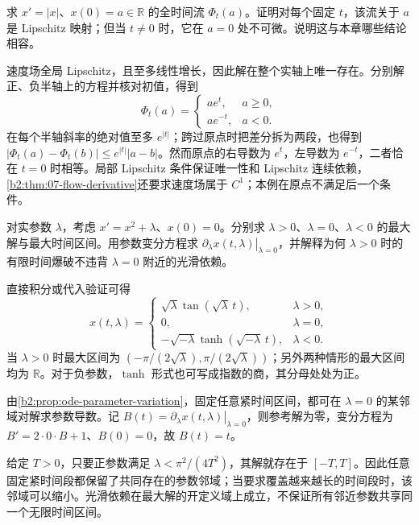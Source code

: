 \begin{exercise}[唯一的流未必可微]\label{b2:ex:ode-lipschitz-nonsmooth-flow}
求 \(x'=|x|\)、\(x(0)=a\in\mathbb R\) 的全时间流 \(\Phi_t(a)\)。证明对每个固定 \(t\)，该流关于 \(a\) 是 Lipschitz 映射；但当 \(t\ne0\) 时，它在 \(a=0\) 处不可微。说明这与本章哪些结论相容。
\end{exercise}
\begin{solution}
速度场全局 Lipschitz，且至多线性增长，因此解在整个实轴上唯一存在。分别解正、负半轴上的方程并核对初值，得到
\[
 \Phi_t(a)=
 \begin{cases}
 ae^t,&a\geq0,\\
 ae^{-t},&a<0.
 \end{cases}
\]
在每个半轴斜率的绝对值至多 \(e^{|t|}\)；跨过原点时把差分拆为两段，也得到 \(|\Phi_t(a)-\Phi_t(b)|\leq e^{|t|}|a-b|\)。然而原点的右导数为 \(e^t\)，左导数为 \(e^{-t}\)，二者恰在 \(t=0\) 时相等。局部 Lipschitz 条件保证唯一性和 Lipschitz 连续依赖，\cref{b2:thm:07-flow-derivative}还要求速度场属于 \(C^1\)；本例在原点不满足后一个条件。
\end{solution}

\begin{exercise}[参数导数与存在时间]\label{b2:ex:ode-parameter-lifetime}
对实参数 \(\lambda\)，考虑 \(x'=x^2+\lambda\)、\(x(0)=0\)。分别求 \(\lambda>0\)、\(\lambda=0\)、\(\lambda<0\) 的最大解与最大时间区间。用参数变分方程求 \(\left.\partial_\lambda x(t,\lambda)\right|_{\lambda=0}\)，并解释为何 \(\lambda>0\) 时的有限时间爆破不违背 \(\lambda=0\) 附近的光滑依赖。
\end{exercise}
\begin{solution}
直接积分或代入验证可得
\[
 x(t,\lambda)=
 \begin{cases}
 \sqrt\lambda\tan(\sqrt\lambda\,t),&\lambda>0,\\
 0,&\lambda=0,\\
 -\sqrt{-\lambda}\tanh(\sqrt{-\lambda}\,t),&\lambda<0.
 \end{cases}
\]
当 \(\lambda>0\) 时最大区间为 \((-\pi/(2\sqrt\lambda),\pi/(2\sqrt\lambda))\)；另外两种情形的最大区间均为 \(\mathbb R\)。对于负参数，\(\tanh\) 形式也可写成指数的商，其分母处处为正。

由\cref{b2:prop:ode-parameter-variation}，固定任意紧时间区间，都可在 \(\lambda=0\) 的某邻域对解求参数导数。记 \(B(t)=\left.\partial_\lambda x(t,\lambda)\right|_{\lambda=0}\)，则参考解为零，变分方程为 \(B'=2\cdot0\cdot B+1\)、\(B(0)=0\)，故 \(B(t)=t\)。

给定 \(T>0\)，只要正参数满足 \(\lambda<\pi^2/(4T^2)\)，其解就存在于 \([-T,T]\)。因此任意固定紧时间段都保留了共同存在的参数邻域；当要求覆盖越来越长的时间段时，该邻域可以缩小。光滑依赖在最大解的开定义域上成立，不保证所有邻近参数共享同一个无限时间区间。
\end{solution}

